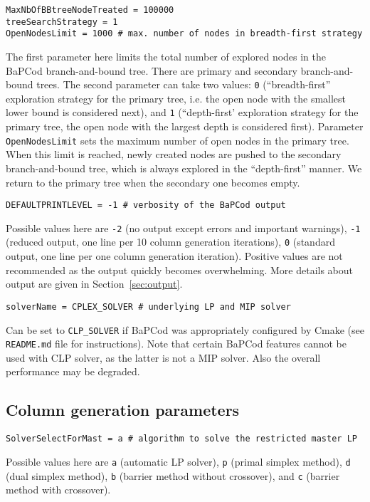 \documentclass[10pt,a4paper]{article}
\newcommand{\bc}{BaPCod\xspace}
\begin{document}
\begin{lstlisting}
MaxNbOfBBtreeNodeTreated = 100000 
treeSearchStrategy = 1 
OpenNodesLimit = 1000 # max. number of nodes in breadth-first strategy
\end{lstlisting}
The first parameter here limits the total number of explored nodes in the \bc branch-and-bound tree.  There are primary
and secondary branch-and-bound trees. The second parameter can take two values: \verb+0+ (``breadth-first'' exploration
strategy for the primary tree, i.e. the open node with the smallest lower bound is considered next), and \verb+1+
(``depth-first' exploration strategy for the primary tree, the open node with the largest depth is considered
first). Parameter \verb+OpenNodesLimit+ sets the maximum number of open nodes in the primary tree. When this limit is
reached, newly created nodes are pushed to the secondary branch-and-bound tree, which is always explored in the
``depth-first'' manner. We return to the primary tree when the secondary one becomes empty.

\begin{lstlisting}
DEFAULTPRINTLEVEL = -1 # verbosity of the BaPCod output
\end{lstlisting}
Possible values here are \verb+-2+ (no output except errors and important warnings), \verb+-1+ (reduced output, one line
per 10 column generation iterations), \verb+0+ (standard output, one line per one column generation iteration). Positive
values are not recommended as the output quickly becomes overwhelming. More details about output are given in
Section~\ref{sec:output}. 

\begin{lstlisting}
solverName = CPLEX_SOLVER # underlying LP and MIP solver
\end{lstlisting}
Can be set to \verb+CLP_SOLVER+ if BaPCod was appropriately configured by Cmake (see \verb+README.md+ file for instructions). Note that certain BaPCod features cannot be used with CLP solver, as the latter is not a MIP solver. Also the overall performance may be degraded.

\subsection{Column generation parameters}
\label{sec:colgenconfig}

\begin{lstlisting}
SolverSelectForMast = a # algorithm to solve the restricted master LP
\end{lstlisting}
Possible values here are \verb+a+ (automatic LP solver), \verb+p+ (primal simplex method), \verb+d+ (dual simplex
method), \verb+b+ (barrier method without crossover), and \verb+c+ (barrier method with crossover).
\end{document}
